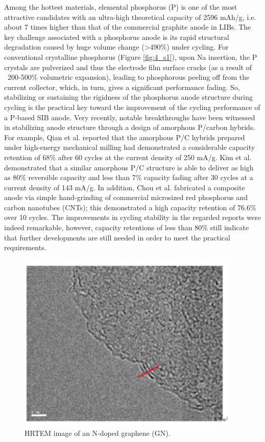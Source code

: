 Among the hottest materials, elemental phosphorus (P) is one of the most attractive candidates with an ultra-high theoretical capacity of 2596 mAh/g,\cite{Qian2013b,Kim2013c,Li2013c} i.e. about 7 times higher than that of the commercial graphite anode in LIBs. The key challenge associated with a phosphorus anode is its rapid structural degradation caused by huge volume change (>490\%) under cycling. For conventional crystalline phosphorus (Figure \ref{fig:4_s1}), upon Na insertion, the P crystals are pulverized and thus the electrode film surface cracks (as a result of ~200-500\% volumetric expansion), leading to phosphorous peeling off from the current collector, which, in turn, gives a significant performance fading. So, stabilizing or sustaining the rigidness of the phosphorus anode structure during cycling is the practical key toward the improvement of the cycling performance of a P-based SIB anode. Very recently, notable breakthroughs have been witnessed in stabilizing anode structure through a design of amorphous P/carbon hybrids.\cite{Qian2013b,Kim2013c,Li2013c} For example, Qian et al. reported that the amorphous P/C hybrids prepared under high-energy mechanical milling had demonstrated a considerable capacity retention of 68\% after 60 cycles at the current density of 250 mA/g.\cite{Qian2013b} Kim et al. demonstrated that a similar amorphous P/C structure is able to deliver as high as 80\% reversible capacity and less than 7\% capacity fading after 30 cycles at a current density of 143 mA/g.\cite{Kim2013c} In addition, Chou et al. fabricated a composite anode via simple hand-grinding of commercial microsized red phosphorus and carbon nanotubes (CNTs); this demonstrated a high capacity retention of 76.6\% over 10 cycles.\cite{Li2013c} The improvements in cycling stability in the regarded reports were indeed remarkable, however, capacity retentions of less than 80\% still indicate that further developments are still needed in order to meet the practical requirements.\cite{Luo2015b}\\

\begin{figure}  
\centering
\includegraphics[width=300pt]{figures/figure4_s2}
\caption[TEM of GN]
{HRTEM image of an N-doped graphene (GN).
\label{fig:4_s2}}
\end{figure}

